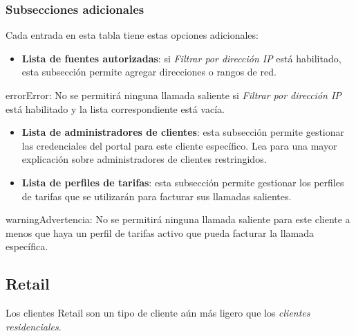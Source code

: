 \documentclass[letterpaper,10pt,spanish]{sphinxmanual}
\begin{document}
\subsubsection{Subsecciones adicionales}
\label{administration_portal/brand/clients/residential:additional-subsections}
Cada entrada en esta tabla tiene estas opciones adicionales:
\begin{itemize}
\item {} 
\textbf{Lista de fuentes autorizadas}: si \emph{Filtrar por dirección IP} está habilitado, esta subsección permite agregar direcciones o rangos de red.

\end{itemize}

\begin{notice}{error}{Error:}
No se permitirá ninguna llamada saliente si \emph{Filtrar por dirección IP} está habilitado y la lista correspondiente está vacía.
\end{notice}
\begin{itemize}
\item {} 
\textbf{Lista de administradores de clientes}: esta subsección permite gestionar las credenciales del portal para este cliente específico. Lea {\hyperref[api_rest/acls:acls]{}} para una mayor explicación sobre administradores de clientes restringidos.

\item {} 
\textbf{Lista de perfiles de tarifas}: esta subsección permite gestionar los perfiles de tarifas que se utilizarán para facturar sus llamadas salientes.

\end{itemize}

\begin{notice}{warning}{Advertencia:}
No se permitirá ninguna llamada saliente para este cliente a menos que haya un perfil de tarifas activo que pueda facturar la llamada específica.
\end{notice}


\subsection{Retail}
\label{administration_portal/brand/clients/retail:retail-clients}\label{administration_portal/brand/clients/retail:retail}\label{administration_portal/brand/clients/retail::doc}
Los clientes Retail son un tipo de cliente aún más ligero que los \emph{clientes residenciales}.
\end{document}

